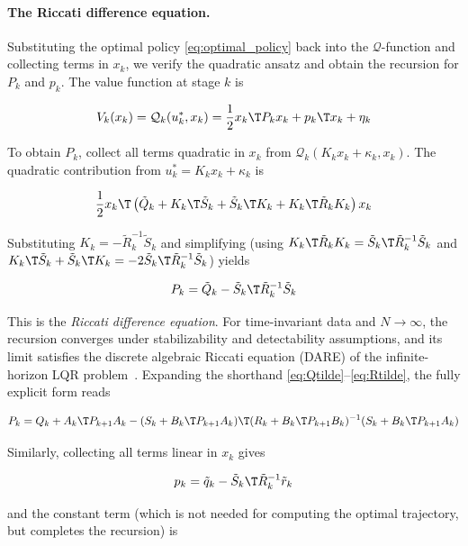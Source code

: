 \paragraph{The Riccati difference equation.}
Substituting the optimal policy \eqref{eq:optimal_policy} back into the $\mathcal{Q}$-function and collecting terms in $x_k$, we verify the quadratic ansatz and obtain the recursion for $P_k$ and $p_k$.
The value function at stage $k$ is

\[
V_k(x_k) = \mathcal{Q}_k(u_k^*, x_k) = \frac{1}{2} x_k\T P_k x_k + p_k\T x_k + \eta_k
\]

To obtain $P_k$, collect all terms quadratic in $x_k$ from $\mathcal{Q}_k(K_k x_k + \kappa_k, x_k)$.
The quadratic contribution from $u_k^* = K_k x_k + \kappa_k$ is

\begin{equation*}
\frac{1}{2} x_k\T \left( \tilde{Q}_k + K_k\T \tilde{S}_k + \tilde{S}_k\T K_k + K_k\T \tilde{R}_k K_k \right) x_k
\end{equation*}

Substituting $K_k = -\tilde{R}_k^{-1} \tilde{S}_k$ and simplifying (using $K_k\T \tilde{R}_k K_k = \tilde{S}_k\T \tilde{R}_k^{-1} \tilde{S}_k$ and $K_k\T \tilde{S}_k + \tilde{S}_k\T K_k = -2 \tilde{S}_k\T \tilde{R}_k^{-1} \tilde{S}_k$) yields

\begin{equation} \label{eq:riccati_P}
P_k = \tilde{Q}_k - \tilde{S}_k\T \tilde{R}_k^{-1} \tilde{S}_k
\end{equation}

This is the \textit{Riccati difference equation}.
For time-invariant data and $N \to \infty$, the recursion converges under stabilizability and detectability assumptions, and its limit satisfies the discrete algebraic Riccati equation (DARE) of the infinite-horizon LQR problem~\cite{bertsekas1995dynamic}.
Expanding the shorthand \eqref{eq:Qtilde}--\eqref{eq:Rtilde}, the fully explicit form reads

\[
P_k = Q_k + A_k\T P_{k+1} A_k - (S_k + B_k\T P_{k+1} A_k)\T(R_k + B_k\T P_{k+1} B_k)^{-1}(S_k + B_k\T P_{k+1} A_k)
\]

Similarly, collecting all terms linear in $x_k$ gives

\begin{equation} \label{eq:riccati_p}
p_k = \tilde{q}_k - \tilde{S}_k\T \tilde{R}_k^{-1} \tilde{r}_k
\end{equation}

and the constant term (which is not needed for computing the optimal trajectory, but completes the recursion) is

